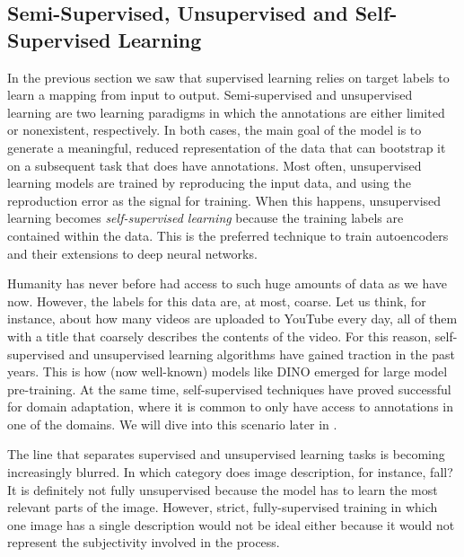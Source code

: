 \subsection{Semi-Supervised, Unsupervised and Self-Supervised Learning}\label{subsec:semi_self}
In the previous section we saw that supervised learning relies on target labels to learn a mapping from input to output. Semi-supervised and unsupervised learning are two learning paradigms in which the annotations are either limited or nonexistent, respectively. In both cases, the main goal of the model is to generate a meaningful, reduced representation of the data that can bootstrap it on a subsequent task that does have annotations. Most often, unsupervised learning models are trained by reproducing the input data, and using the reproduction error as the signal for training. When this happens, unsupervised learning becomes \textit{self-supervised learning} because the training labels are contained within the data. This is the preferred technique to train autoencoders and their extensions to deep neural networks. 

Humanity has never before had access to such huge amounts of data as we have now. However, the labels for this data are, at most, coarse. Let us think, for instance, about how many videos are uploaded to YouTube every day, all of them with a title that coarsely describes the contents of the video. For this reason, self-supervised and unsupervised learning algorithms have gained traction in the past years. This is how (now well-known) models like DINO emerged for large model pre-training. At the same time, self-supervised techniques have proved successful for domain adaptation, where it is common to only have access to annotations in one of the domains. We will dive into this scenario later in .

The line that separates supervised and unsupervised learning tasks is becoming increasingly blurred. In which category does image description, for instance, fall? It is definitely not fully unsupervised because the model has to learn the most relevant parts of the image. However, strict, fully-supervised training in which one image has a single description would not be ideal either because it would not represent the subjectivity involved in the process.

